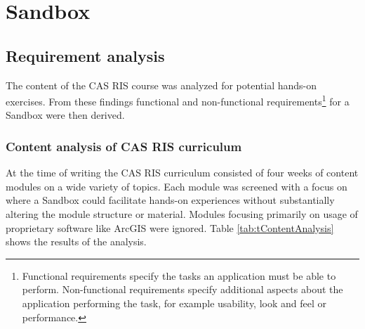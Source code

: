 \documentclass[11pt, a4paper, oneside, parskip=full-]{scrartcl}
\begin{document}
\section{Sandbox}

\subsection{Requirement analysis} \label{sectionrequirements}

The content of the CAS RIS course was analyzed for potential hands-on exercises.
From these findings functional and non-functional
requirements\footnote{Functional requirements specify the tasks an application
must be able to perform. Non-functional requirements specify additional aspects
about the application performing the task, for example usability, look and feel
or performance. } for a Sandbox were then derived.

\subsubsection{Content analysis of CAS RIS curriculum}
At the time of writing the CAS RIS curriculum consisted of four weeks of content
modules on a wide variety of topics. Each module was screened with a focus on
where a Sandbox could facilitate hands-on experiences without substantially
altering the module structure or material. Modules focusing primarily on usage
of proprietary software like ArcGIS were ignored. Table
\ref{tab:tContentAnalysis} shows the results of the analysis.
\end{document}
